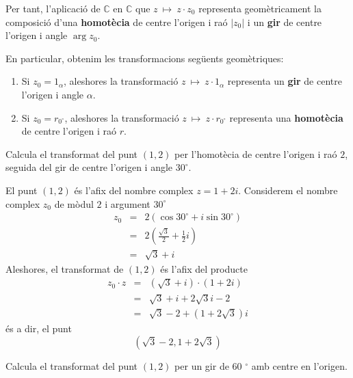 Per tant, l’aplicació de $\mathbb{C}$ en $\mathbb{C}$ que $
z~\longmapsto ~z\cdot z_{0}$ representa geomètricament la composició d’una \textbf{homotècia} de centre l’origen i raó $\left\vert
z_{0}\right\vert $ i un \textbf{gir} de centre l’origen i angle $\arg
z_{0}$.

En particular, obtenim les transformacions següents geomètriques:

\begin{enumerate}
\item[1)] Si $z_{0}=1_{\alpha }$, aleshores la transformació $
z~\longmapsto ~z\cdot 1_{\alpha }$ representa un \textbf{gir} de centre l’origen i angle $\alpha $.

\item[2)] Si $z_{0}=r_{0
^{\circ}
}$, aleshores la transformació $z~\longmapsto ~z\cdot r_{0
^{\circ}
}$ representa una \textbf{homotècia} de centre l’origen i raó $r$.
\end{enumerate}

\begin{exemple}
Calcula el transformat del punt $(1,2)$ per l’homotècia de centre l’origen i raó $2$, seguida del gir de centre l’origen i angle $30
^{\circ}
$.
\end{exemple}

\begin{solucio}
El punt $(1,2)$ és l’afix del nombre complex $z=1+2i$. Considerem
el nombre complex $z_{0}$ de mòdul $2$ i argument $30
^{\circ}
$
\begin{eqnarray*}
z_{0} &=&2(\cos 30
^{\circ}
+i\sin 30
^{\circ}
) \\
&=&2\left( \frac{\sqrt{3}}{2}+\frac{1}{2}i\right) \\
&=&\sqrt{3}+i
\end{eqnarray*}
Aleshores, el transformat de $(1,2)$ és l’afix del producte
\begin{eqnarray*}
z_{0}\cdot z &=&(\sqrt{3}+i)\cdot (1+2i) \\
&=&\sqrt{3}+i+2\sqrt{3}i-2 \\
&=&\sqrt{3}-2+(1+2\sqrt{3})i
\end{eqnarray*}
és a dir, el punt
\begin{equation*}
\left( \sqrt{3}-2,1+2\sqrt{3}\right)
\end{equation*}
\end{solucio}

\begin{exemple}
Calcula el transformat del punt $(1,2)$ per un gir de 60
$^{\circ}$
amb centre en l’origen.
\end{exemple}

